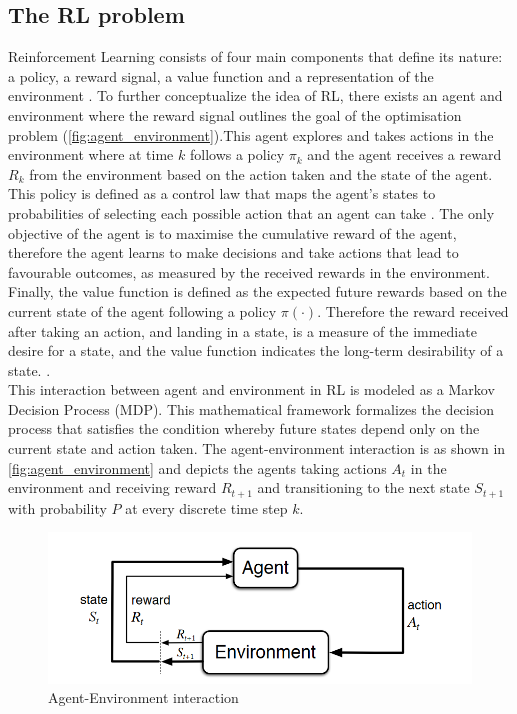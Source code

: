 \subsection{The RL problem}
Reinforcement Learning consists of four main components that define its nature: a policy, a reward signal, a value function and a representation of the environment \cite{suttonReinforcementLearningIntroduction2014}. To further conceptualize the idea of RL, there exists an agent and environment where the reward signal outlines the goal of the optimisation problem (\autoref{fig:agent_environment}).This agent explores and takes actions in the environment where at time $k$ follows a policy $\pi_{k}$ and the agent receives a reward $R_{k}$ from the environment based on the action taken and the state of the agent. This policy is defined as a control law that maps the agent's states to probabilities of selecting each possible action that an agent can take \cite{suttonReinforcementLearningIntroduction2014}. The only objective of the agent is to maximise the cumulative reward of the agent, therefore the agent learns to make decisions and take actions that lead to favourable outcomes, as measured by the received rewards in the environment. Finally, the value function is defined as the expected future rewards based on the current state of the agent following a policy $\pi(\cdot)$. Therefore the reward received after taking an action, and landing in a state,  is a measure of the immediate desire for a state, and the value function indicates the long-term desirability of a state. \cite{suttonReinforcementLearningIntroduction2014}.\\

This interaction between agent and environment in RL is modeled as a Markov Decision Process (MDP). This mathematical framework formalizes the decision process that satisfies the condition whereby future states depend only on the current state and action taken. The agent-environment interaction is as shown in \autoref{fig:agent_environment} and depicts the agents taking actions $A_t$ in the environment and receiving reward $R_{t+1}$ and transitioning to the next state $S_{t+1}$ with probability $P$ at every discrete time step $k$.



\begin{figure}[h]
	\centering
	\includegraphics[width=0.75\linewidth]{figures/agent-environment.png}
	\caption{Agent-Environment interaction \cite{suttonReinforcementLearningIntroduction2014}}
	\label{fig:agent_environment}
\end{figure}

